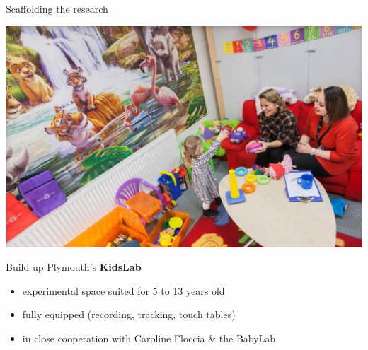 \documentclass[compress]{beamer}
\begin{document}

\begin{frame}{Scaffolding the research}

            \begin{center}
                \includegraphics[width=0.6\linewidth]{plymouth/babylab}

            \end{center}

            Build up Plymouth's \textbf{KidsLab}
                \begin{itemize}
                    \item experimental space suited for 5 to 13 years old
                    \item fully equipped (recording, tracking, touch tables)
                    \item in close cooperation with Caroline Floccia \& the
                        BabyLab
                \end{itemize}

\end{frame}

\end{document}
